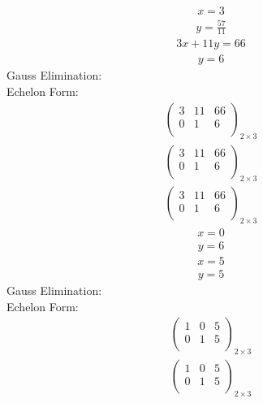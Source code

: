 \documentclass{article}
\begin{document}
\begin{align*}
x=3\end{align*}
\begin{align*}
y=\frac{57}{11}\end{align*}
\begin{align*}
3x + 11y=66\end{align*}
\begin{align*}
y=6\end{align*}
Gauss Elimination:\\
Echelon Form:\\
\begin{align*}
\left(
\begin{array}{cc|c}
3 & 11 & 66\\
0 & 1 & 6\\
\end{array}
\right)_{2\times 3}
\end{align*}
\begin{align*}
\left(
\begin{array}{cc|c}
3 & 11 & 66\\
0 & 1 & 6\\
\end{array}
\right)_{2\times 3}
\end{align*}
\begin{align*}
\left(
\begin{array}{cc|c}
3 & 11 & 66\\
0 & 1 & 6\\
\end{array}
\right)_{2\times 3}
\end{align*}
\begin{align*}
x=0\end{align*}
\begin{align*}
y=6\end{align*}
\begin{align*}
x=5\end{align*}
\begin{align*}
y=5\end{align*}
Gauss Elimination:\\
Echelon Form:\\
\begin{align*}
\left(
\begin{array}{cc|c}
1 & 0 & 5\\
0 & 1 & 5\\
\end{array}
\right)_{2\times 3}
\end{align*}
\begin{align*}
\left(
\begin{array}{cc|c}
1 & 0 & 5\\
0 & 1 & 5\\
\end{array}
\right)_{2\times 3}
\end{align*}
\end{document}
